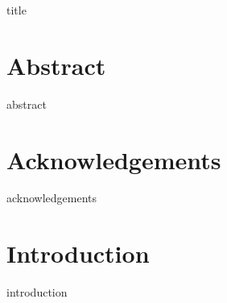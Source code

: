 \documentclass[a4paper,12pt]{report}
\begin{document}
{title}


\normalsize

\chapter*{Abstract}
{abstract}

\chapter*{Acknowledgements}
{acknowledgements}

\tableofcontents

\cleardoublepage
{}
{}
\listoffigures

\cleardoublepage
{}
{}
\listoftables


\chapter{Introduction}
{introduction}

\nocite{*}  %
\printbibliography[
    heading=bibintoc,
    title={Bibliography}]
\end{document}
